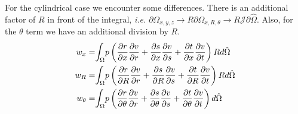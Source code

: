 \documentclass{kthreport}
\begin{document}
For the cylindrical case we encounter some differences. There is an additional factor of $R$ in front of the integral, \textit{i.e.} $\partial \Omega_{x,y,z} \rightarrow R\partial \Omega_{x,R,\theta} \rightarrow R\mathcal{J}\partial \hat{\Omega}$. Also, for the $\theta$ term we have an additional division by $R$.
\begin{eqnarray}
	w_{x} =& \mathlarger\int_{\Omega} p\left(\dfrac{\partial r}{\partial x}\dfrac{\partial v}{\partial r} + \dfrac{\partial s}{\partial x}\dfrac{\partial v}{\partial s} + \dfrac{\partial t}{\partial x}\dfrac{\partial v}{\partial t}\right) R d\hat{\Omega} \nonumber \\
	w_{R} =& \mathlarger\int_{\Omega} p\left(\dfrac{\partial r}{\partial R}\dfrac{\partial v}{\partial r} + \dfrac{\partial s}{\partial R}\dfrac{\partial v}{\partial s} + \dfrac{\partial t}{\partial R}\dfrac{\partial v}{\partial t}\right) R d\hat{\Omega} \nonumber \\
	w_{\theta} =& \mathlarger\int_{\Omega} p\left(\dfrac{\partial r}{\partial \theta}\dfrac{\partial v}{\partial r} + \dfrac{\partial s}{\partial \theta}\dfrac{\partial v}{\partial s} + \dfrac{\partial t}{\partial \theta}\dfrac{\partial v}{\partial t}\right) d\hat{\Omega} \nonumber
\end{eqnarray}
\end{document}
